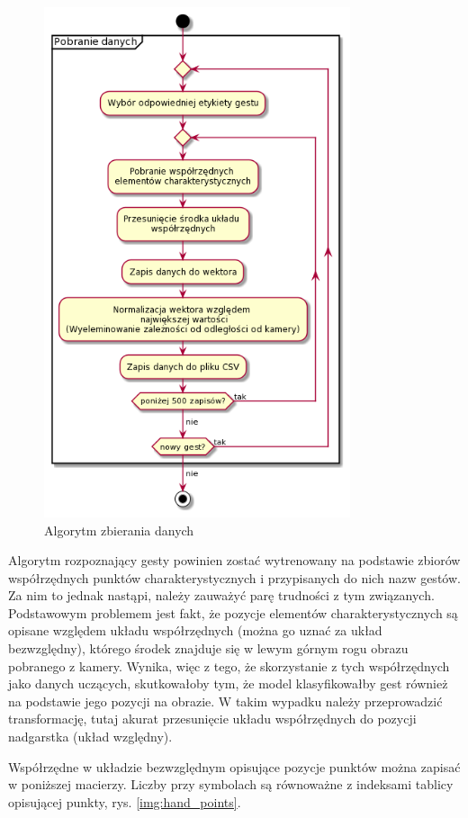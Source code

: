 \begin{figure}
    \begin{center}
        \includegraphics[width=9cm]{../images/get_data.png}
        \caption{Algorytm zbierania danych}
    \end{center}
\end{figure}

\quad Algorytm rozpoznający gesty powinien zostać wytrenowany na podstawie zbiorów współrzędnych punktów charakterystycznych i przypisanych do nich nazw gestów. Za nim to jednak nastąpi, należy zauważyć parę trudności z tym związanych. Podstawowym problemem jest fakt, że pozycje elementów charakterystycznych są opisane względem układu współrzędnych (można go uznać za układ bezwzględny), którego środek znajduje się w lewym górnym rogu obrazu pobranego z kamery. Wynika, więc z tego, że skorzystanie z tych współrzędnych jako danych uczących, skutkowałoby tym, że model klasyfikowałby gest również na podstawie jego pozycji na obrazie. W takim wypadku należy przeprowadzić transformację, tutaj akurat przesunięcie układu współrzędnych do pozycji nadgarstka (układ względny). \newpage

\quad Współrzędne w układzie bezwzględnym opisujące pozycje punktów można zapisać w poniższej macierzy. Liczby przy symbolach są równoważne z indeksami tablicy opisującej punkty, rys. \ref{img:hand_points}.

